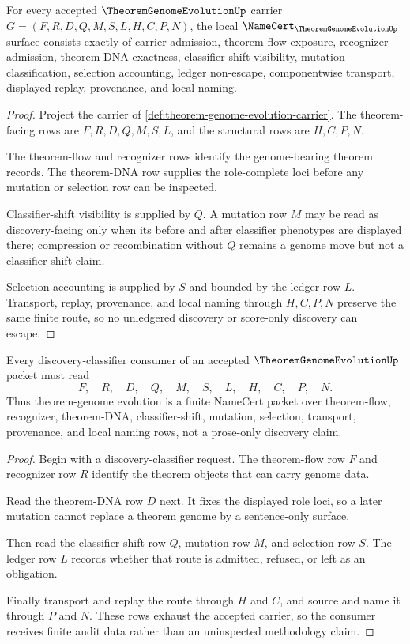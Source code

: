 \begin{theorem}
\label{thm:theorem-genome-evolution-namecert-obligations}
For every accepted $\TheoremGenomeEvolutionUp$ carrier $G=(F,R,D,Q,M,S,L,H,C,P,N)$, the local $\NameCert_{\TheoremGenomeEvolutionUp}$ surface consists exactly of carrier admission, theorem-flow exposure, recognizer admission, theorem-DNA exactness, classifier-shift visibility, mutation classification, selection accounting, ledger non-escape, componentwise transport, displayed replay, provenance, and local naming.
\end{theorem}
\begin{proof}
Project the carrier of \autoref{def:theorem-genome-evolution-carrier}. The theorem-facing rows are $F,R,D,Q,M,S,L$, and the structural rows are $H,C,P,N$.

The theorem-flow and recognizer rows identify the genome-bearing theorem records. The theorem-DNA row supplies the role-complete loci before any mutation or selection row can be inspected.

Classifier-shift visibility is supplied by $Q$. A mutation row $M$ may be read as discovery-facing only when its before and after classifier phenotypes are displayed there; compression or recombination without $Q$ remains a genome move but not a classifier-shift claim.

Selection accounting is supplied by $S$ and bounded by the ledger row $L$. Transport, replay, provenance, and local naming through $H,C,P,N$ preserve the same finite route, so no unledgered discovery or score-only discovery can escape.
\end{proof}

\begin{theorem}
\label{thm:theorem-genome-evolution-audit-route}
Every discovery-classifier consumer of an accepted $\TheoremGenomeEvolutionUp$ packet must read
$$
F,\quad R,\quad D,\quad Q,\quad M,\quad S,\quad L,\quad H,\quad C,\quad P,\quad N .
$$
Thus theorem-genome evolution is a finite NameCert packet over theorem-flow, recognizer, theorem-DNA, classifier-shift, mutation, selection, transport, provenance, and local naming rows, not a prose-only discovery claim.
\end{theorem}
\begin{proof}
Begin with a discovery-classifier request. The theorem-flow row $F$ and recognizer row $R$ identify the theorem objects that can carry genome data.

Read the theorem-DNA row $D$ next. It fixes the displayed role loci, so a later mutation cannot replace a theorem genome by a sentence-only surface.

Then read the classifier-shift row $Q$, mutation row $M$, and selection row $S$. The ledger row $L$ records whether that route is admitted, refused, or left as an obligation.

Finally transport and replay the route through $H$ and $C$, and source and name it through $P$ and $N$. These rows exhaust the accepted carrier, so the consumer receives finite audit data rather than an uninspected methodology claim.
\end{proof}

